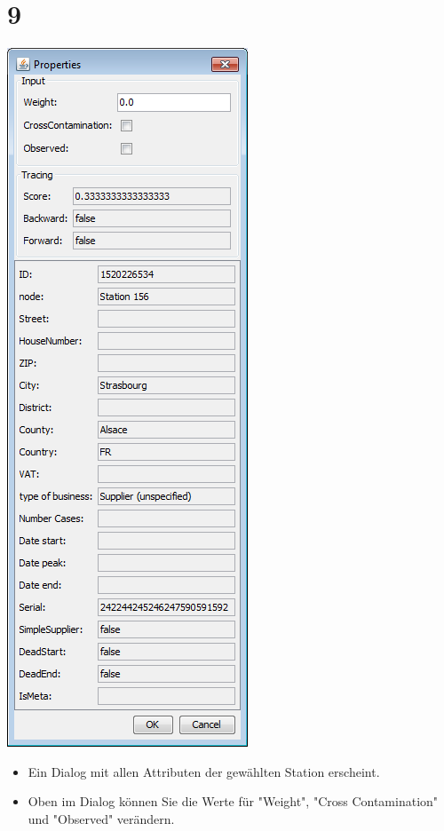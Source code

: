 \documentclass{beamer}
\begin{document}
\section{9}
\begin{frame}
	\begin{center}
  		\includegraphics[height=0.6\textheight]{9.png}
	\end{center}
	\begin{itemize}
		\item Ein Dialog mit allen Attributen der gewählten Station erscheint.
		\item Oben im Dialog können Sie die Werte für "Weight", "Cross Contamination" und "Observed" verändern.		
	\end{itemize}
\end{frame}
\end{document}
